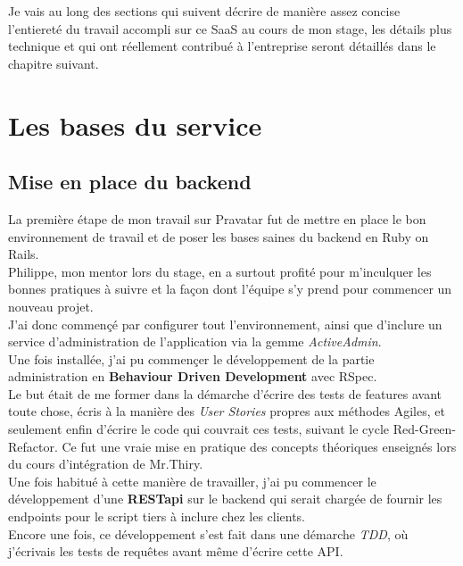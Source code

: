 \documentclass{report}
\begin{document}
  Je vais au long des sections qui suivent décrire de manière assez concise l'entiereté du travail accompli sur ce SaaS au cours de mon stage, les détails plus technique et qui ont réellement contribué
  à l'entreprise seront détaillés dans le chapitre suivant.\\

  \section{Les bases du service}
  \label{sec:Les bases du service}

    \subsection{Mise en place du backend}
    \label{subs:Mise en place du backend}

      La première étape de mon travail sur Pravatar fut de mettre en place le bon environnement de travail et de poser les bases saines du backend en Ruby on Rails.\\
      Philippe, mon mentor lors du stage, en a surtout profité pour m'inculquer les bonnes pratiques à suivre et la façon dont l'équipe s'y prend pour commencer un nouveau projet.\\

      J'ai donc commençé par configurer tout l'environnement, ainsi que d'inclure un service d'administration de l'application via la gemme \textit{ActiveAdmin}.\\
      Une fois installée, j'ai pu commençer le développement de la partie administration en \textbf{Behaviour Driven Development} avec RSpec.\\

      Le but était de me former dans la démarche d'écrire des tests de features avant toute chose, écris à la manière des \textit{User Stories} propres aux méthodes Agiles, et seulement enfin
      d'écrire le code qui couvrait ces tests, suivant le cycle Red-Green-Refactor. Ce fut une vraie mise en pratique des concepts théoriques enseignés lors du cours d'intégration de Mr.Thiry.\\

      Une fois habitué à cette manière de travailler, j'ai pu commencer le développement d'une \textbf{RESTapi} sur le backend qui serait chargée de fournir les endpoints pour le script tiers
      à inclure chez les clients.\\
      Encore une fois, ce développement s'est fait dans une démarche \textit{TDD}, où j'écrivais les tests de requêtes avant même d'écrire cette API.\\
\end{document}
